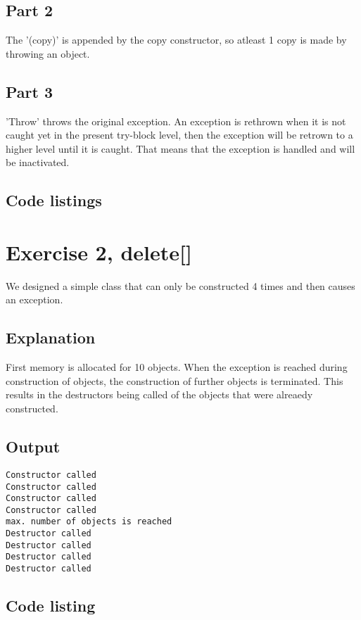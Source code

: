 \documentclass[11pt]{article}
\begin{document}
\subsection*{Part 2}
The '(copy)' is appended by the copy constructor, so atleast 1 copy is made
by throwing an object.

\subsection*{Part 3}
'Throw' throws the original exception. An exception is rethrown when it is not caught yet in the present try-block level, then the exception will be retrown to a higher level until it is caught.
That means that the exception is handled and will be inactivated.

\subsection*{Code listings}



\section*{Exercise 2, delete[]}
We designed a simple class that can only be constructed 4 times and then causes an exception.

\subsection*{Explanation}
First memory is allocated for 10 objects.
When the exception is reached during construction of objects, the construction of further objects is terminated.
This results in the destructors being called of the objects that were alreaedy constructed.

\subsection*{Output}
\begin{lstlisting}
Constructor called
Constructor called
Constructor called
Constructor called
max. number of objects is reached 
Destructor called
Destructor called
Destructor called
Destructor called
\end{lstlisting}

\subsection*{Code listing}




\end{document}
